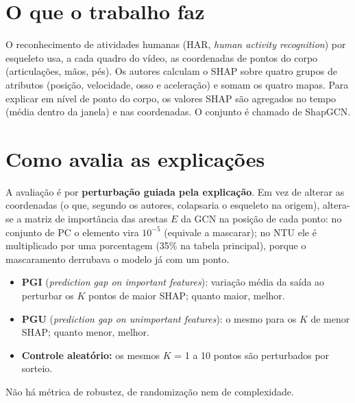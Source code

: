 \documentclass[11pt,a4paper]{article}
\begin{document}
\section{O que o trabalho faz}
O reconhecimento de atividades humanas (HAR, \textit{human activity recognition}) por esqueleto usa, a cada quadro do vídeo, as coordenadas de pontos do corpo (articulações, mãos, pés). Os autores calculam o SHAP sobre quatro grupos de atributos (posição, velocidade, osso e aceleração) e somam os quatro mapas. Para explicar em nível de ponto do corpo, os valores SHAP são agregados no tempo (média dentro da janela) e nas coordenadas. O conjunto é chamado de ShapGCN.

\section{Como avalia as explicações}
A avaliação é por \textbf{perturbação guiada pela explicação}. Em vez de alterar as coordenadas (o que, segundo os autores, colapsaria o esqueleto na origem), altera-se a matriz de importância das arestas $E$ da GCN na posição de cada ponto: no conjunto de PC o elemento vira $10^{-5}$ (equivale a mascarar); no NTU ele é multiplicado por uma porcentagem (35\% na tabela principal), porque o mascaramento derrubava o modelo já com um ponto.
\begin{itemize}
\item \textbf{PGI} (\textit{prediction gap on important features}): variação média da saída ao perturbar os $K$ pontos de maior SHAP; quanto maior, melhor.
\item \textbf{PGU} (\textit{prediction gap on unimportant features}): o mesmo para os $K$ de menor SHAP; quanto menor, melhor.
\item \textbf{Controle aleatório:} os mesmos $K$ = 1 a 10 pontos são perturbados por sorteio.
\end{itemize}
Não há métrica de robustez, de randomização nem de complexidade.
\end{document}
